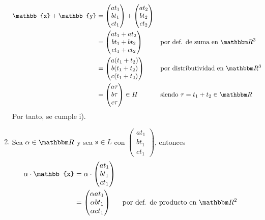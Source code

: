 \begin{example}
\begin{enumerate}[label=\roman*)]
        \begin{align*}
            \mathbb{x} + \mathbb{y} & = \begin{pmatrix} at_1 \\ bt_1 \\ ct_1 \end{pmatrix} + \begin{pmatrix} at_2 \\ bt_2 \\ ct_2 \end{pmatrix} \\
            & = \begin{pmatrix} at_1+at_2 \\ bt_1+bt_2 \\ ct_1+ct_2 \end{pmatrix} && \text{por def. de suma en $\RR[3]$} \\
            & = \begin{pmatrix} a(t_1+t_2) \\ b(t_1+t_2) \\ c(t_1+t_2) \end{pmatrix} && \text{por distributividad en $\RR[3]$} \\
            & = \begin{pmatrix} a\tau \\ b\tau \\ c\tau \end{pmatrix} \in H && \text{siendo $\tau = t_1+t_2 \in \RR$}
        \end{align*}
        Por tanto, se cumple i).
        \item Sea $\alpha \in \RR$ y sea $\mathbb{x} \in L$ con $\displaystyle \begin{pmatrix} at_1 \\ bt_1 \\ ct_1 \end{pmatrix}$, entonces
        \begin{align*}
            \alpha \cdot \mathbb{x} & = \alpha \cdot \begin{pmatrix} at_1 \\ bt_1 \\ ct_1 \end{pmatrix} \\
            & = \begin{pmatrix} \alpha at_1 \\ \alpha bt_1 \\ \alpha ct_1 \end{pmatrix} && \text{por def. de producto en $\RR[2]$} \\

\end{align*}
\end{enumerate}
\end{example}
